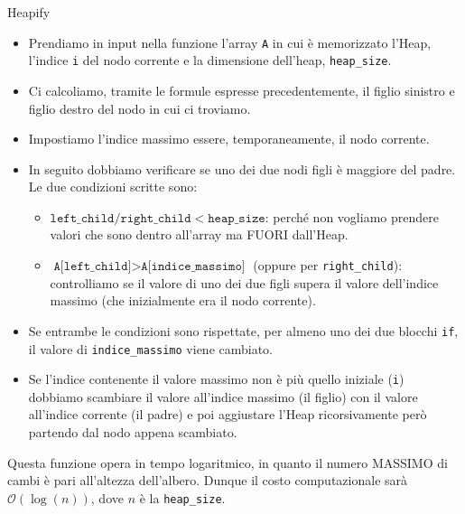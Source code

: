 \documentclass[12pt]{report}
\begin{document}
\begin{description}
    	\begin{algoritmo}{Heapify}{}
    		\begin{itemize}
    			\item Prendiamo in input nella funzione l'array \texttt{A} in cui è memorizzato l'Heap, l'indice \texttt{i} del nodo corrente e la dimensione dell'heap, \texttt{heap\_size}.
    			\item Ci calcoliamo, tramite le formule espresse precedentemente, il figlio sinistro e figlio destro del nodo in cui ci troviamo.
    			\item Impostiamo l'indice massimo essere, temporaneamente, il nodo corrente.
    			\item In seguito dobbiamo verificare se uno dei due nodi figli è maggiore del padre. Le due condizioni scritte sono:
    			\begin{itemize}
    				\item $\texttt{left\_child} / \texttt{right\_child} < \texttt{heap\_size}$: perché non vogliamo prendere valori che sono dentro all'array ma FUORI dall'Heap.
    				\item $\texttt{A[left\_child]} > \texttt{A[indice\_massimo]}$ (oppure per \texttt{right\_child}): controlliamo se il valore di uno dei due figli supera il valore dell'indice massimo (che inizialmente era il nodo corrente).
    			\end{itemize}
    			\item Se entrambe le condizioni sono rispettate, per almeno uno dei due blocchi \texttt{if}, il valore di \texttt{indice\_massimo} viene cambiato.
    			\item Se l'indice contenente il valore massimo non è più quello iniziale (\texttt{i}) dobbiamo scambiare il valore all'indice massimo (il figlio) con il valore all'indice corrente (il padre) e poi aggiustare l'Heap ricorsivamente però partendo dal nodo appena scambiato.
    		\end{itemize}
    	\end{algoritmo}
    	
    	Questa funzione opera in tempo logaritmico, in quanto il numero MASSIMO di cambi è pari all'altezza dell'albero. Dunque il costo computazionale sarà $\mathcal{O}(\log(n))$, dove $n$ è la \texttt{heap\_size}.
    	
    \end{description}
    	
\end{document}

